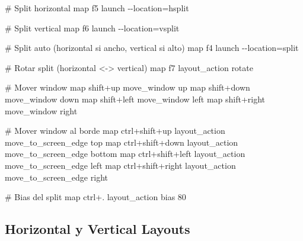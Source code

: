\documentclass[
  doc,
  floatsintext,
  longtable,
  a4paper,
  nolmodern,
  notxfonts,
  notimes,
  12pt,
  colorlinks=true,linkcolor=blue,citecolor=blue,urlcolor=blue]{apa7}
\newenvironment{Shaded}{\begin{snugshade}}{\end{snugshade}}
\newcommand{\CommentTok}[1]{\textcolor[rgb]{0.37,0.37,0.37}{#1}}
\newcommand{\DataTypeTok}[1]{\textcolor[rgb]{0.68,0.00,0.00}{#1}}
\newcommand{\ErrorTok}[1]{\textcolor[rgb]{0.68,0.00,0.00}{#1}}
\newcommand{\OperatorTok}[1]{\textcolor[rgb]{0.37,0.37,0.37}{#1}}
\begin{document}
\begin{Shaded}
\begin{Highlighting}[]
\CommentTok{\# Split horizontal}
\DataTypeTok{map} \DataTypeTok{f5} \DataTypeTok{launch} \DataTypeTok{{-}{-}location}\OperatorTok{=}\DataTypeTok{hsplit}

\CommentTok{\# Split vertical}
\DataTypeTok{map} \DataTypeTok{f6} \DataTypeTok{launch} \DataTypeTok{{-}{-}location}\OperatorTok{=}\DataTypeTok{vsplit}

\CommentTok{\# Split auto (horizontal si ancho, vertical si alto)}
\DataTypeTok{map} \DataTypeTok{f4} \DataTypeTok{launch} \DataTypeTok{{-}{-}location}\OperatorTok{=}\DataTypeTok{split}

\CommentTok{\# Rotar split (horizontal \textless{}{-}\textgreater{} vertical)}
\DataTypeTok{map} \DataTypeTok{f7} \DataTypeTok{layout\_action} \DataTypeTok{rotate}

\CommentTok{\# Mover window}
\DataTypeTok{map} \DataTypeTok{shift}\ErrorTok{+}\DataTypeTok{up} \DataTypeTok{move\_window} \DataTypeTok{up}
\DataTypeTok{map} \DataTypeTok{shift}\ErrorTok{+}\DataTypeTok{down} \DataTypeTok{move\_window} \DataTypeTok{down}
\DataTypeTok{map} \DataTypeTok{shift}\ErrorTok{+}\DataTypeTok{left} \DataTypeTok{move\_window} \DataTypeTok{left}
\DataTypeTok{map} \DataTypeTok{shift}\ErrorTok{+}\DataTypeTok{right} \DataTypeTok{move\_window} \DataTypeTok{right}

\CommentTok{\# Mover window al borde}
\DataTypeTok{map} \DataTypeTok{ctrl}\ErrorTok{+}\DataTypeTok{shift}\ErrorTok{+}\DataTypeTok{up} \DataTypeTok{layout\_action} \DataTypeTok{move\_to\_screen\_edge} \DataTypeTok{top}
\DataTypeTok{map} \DataTypeTok{ctrl}\ErrorTok{+}\DataTypeTok{shift}\ErrorTok{+}\DataTypeTok{down} \DataTypeTok{layout\_action} \DataTypeTok{move\_to\_screen\_edge} \DataTypeTok{bottom}
\DataTypeTok{map} \DataTypeTok{ctrl}\ErrorTok{+}\DataTypeTok{shift}\ErrorTok{+}\DataTypeTok{left} \DataTypeTok{layout\_action} \DataTypeTok{move\_to\_screen\_edge} \DataTypeTok{left}
\DataTypeTok{map} \DataTypeTok{ctrl}\ErrorTok{+}\DataTypeTok{shift}\ErrorTok{+}\DataTypeTok{right} \DataTypeTok{layout\_action} \DataTypeTok{move\_to\_screen\_edge} \DataTypeTok{right}

\CommentTok{\# Bias del split}
\DataTypeTok{map} \DataTypeTok{ctrl}\ErrorTok{+}\DataTypeTok{.} \DataTypeTok{layout\_action} \DataTypeTok{bias} \DataTypeTok{80}
\end{Highlighting}
\end{Shaded}

\subsection{Horizontal y Vertical
Layouts}\label{horizontal-y-vertical-layouts}
\end{document}
